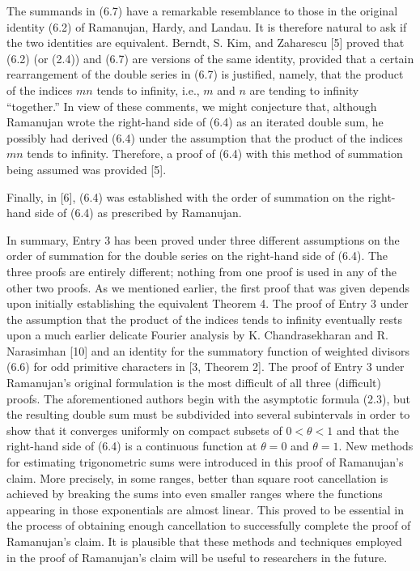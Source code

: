 \documentclass[10pt]{article}
\theoremstyle{plain}
\begin{document}
The summands in (6.7) have a remarkable resemblance to those in the original identity (6.2) of Ramanujan, Hardy, and Landau. It is therefore natural to ask if the two identities are equivalent. Berndt, S. Kim, and Zaharescu [5] proved that (6.2) (or (2.4)) and (6.7) are versions of the same identity, provided that a certain rearrangement of the double series in (6.7) is justified, namely, that the product of the indices $mn$ tends to infinity, i.e., $m$ and $n$ are tending to infinity ``together.'' In view of these comments, we might conjecture that, although Ramanujan wrote the right-hand side of (6.4) as an iterated double sum, he possibly had derived (6.4) under the assumption that the product of the indices $mn$ tends to infinity. Therefore, a proof of (6.4) with this method of summation being assumed was provided [5].

Finally, in [6], (6.4) was established with the order of summation on the right-hand side of (6.4) as prescribed by Ramanujan.

In summary, Entry 3 has been proved under three different assumptions on the order of summation for the double series on the right-hand side of (6.4). The three proofs are entirely different; nothing from one proof is used in any of the other two proofs. As we mentioned earlier, the first proof that was given depends upon initially establishing the equivalent Theorem 4. The proof of Entry 3 under the assumption that the product of the indices tends to infinity eventually rests upon a much earlier delicate Fourier analysis by K. Chandrasekharan and R. Narasimhan [10] and an identity for the summatory function of weighted divisors (6.6) for odd primitive characters in [3, Theorem 2]. The proof of Entry 3 under Ramanujan's original formulation is the most difficult of all three (difficult) proofs. The aforementioned authors begin with the asymptotic formula (2.3), but the resulting double sum must be subdivided into several subintervals in order to show that it converges uniformly on compact subsets of $0<\theta<1$ and that the right-hand side of (6.4) is a continuous function at $\theta=0$ and $\theta=1$. New methods for estimating trigonometric sums were introduced in this proof of Ramanujan's claim. More precisely, in some ranges, better than square root cancellation is achieved by breaking the sums into even smaller ranges where the functions appearing in those exponentials are almost linear. This proved to be essential in the process of obtaining enough cancellation to successfully complete the proof of Ramanujan's claim. It is plausible that these methods and techniques employed in the proof of Ramanujan's claim will be useful to researchers in the future.
\end{document}
